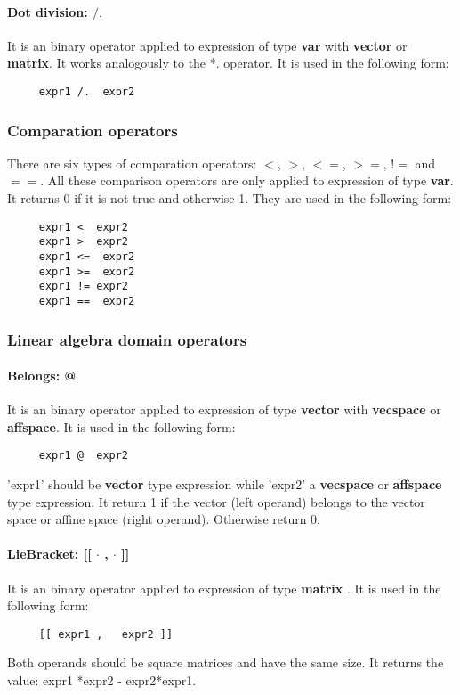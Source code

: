 \documentclass[12pt]{article} %
\begin{document}
\paragraph{Dot division: $/.$}
It is an binary operator applied to expression of type  \textbf{var} with \textbf{vector} or \textbf{matrix}. It works analogously to the *.  operator. It is used in the following form: 
\begin{lstlisting}
     expr1 /.  expr2
\end{lstlisting}

\subsubsection{Comparation operators}
 There are six types of comparation operators:  $<$, $>$, $<=$, $>=$, $!=$ and $==$. 
All these comparison operators are only applied to expression of type  \textbf{var}.  It  returns 0 if it is not true and otherwise 1. They are used in the following form:
\begin{lstlisting}
     expr1 <  expr2
     expr1 >  expr2
     expr1 <=  expr2
     expr1 >=  expr2
     expr1 != expr2
     expr1 ==  expr2
\end{lstlisting}

\subsubsection{Linear algebra domain operators}
\paragraph{Belongs: @}
It is an binary operator applied to expression of type  \textbf{vector} with \textbf{vecspace} or \textbf{affspace}. It is used in the following form:
\begin{lstlisting}
     expr1 @  expr2
\end{lstlisting}
'expr1' should be \textbf{vector} type expression while 'expr2'  a \textbf{vecspace} or \textbf{affspace} type expression. It return 1 if the  vector (left operand) belongs to the vector space or affine space (right operand). Otherwise return 0. 
 
\paragraph{LieBracket: [[ $\cdot$ ,  $\cdot$ ]] }
It is an binary operator applied to expression of type \textbf{matrix} . It is used in the following form:
\begin{lstlisting}
     [[ expr1 ,   expr2 ]]
\end{lstlisting}
Both operands should be square matrices and have the same size. It returns the value: expr1 *expr2 - expr2*expr1.
\end{document}
